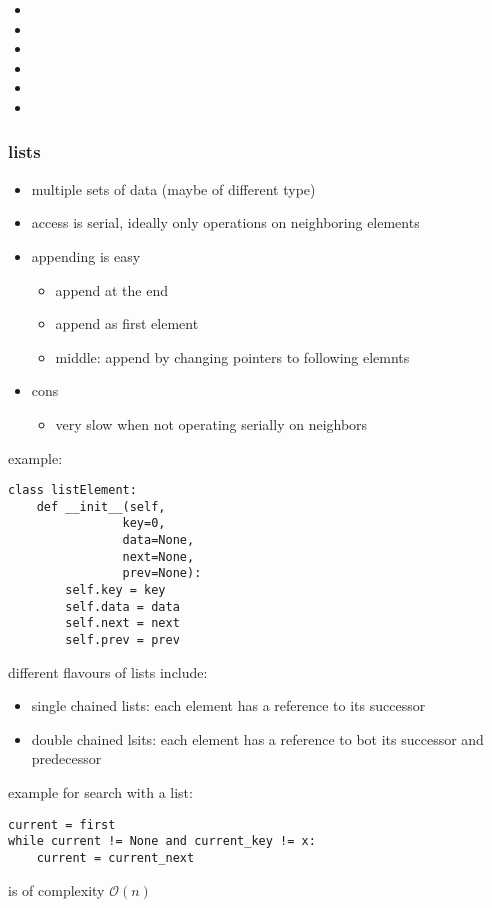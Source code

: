 \documentclass[a4paper]{article}
\begin{document}
\begin{itemize}
    \item {}
    \item {}
    \item {}
    \item {}
    \item {}
    \item {}
\end{itemize}

\subsubsection{lists}
\begin{itemize}
    \item multiple sets of data (maybe of different type)
    \item access is serial, ideally only operations on neighboring elements
    \item appending is easy
        \begin{itemize}
            \item append at the end
            \item append as first element
            \item middle: append by changing pointers to following elemnts
        \end{itemize}
    \item cons
        \begin{itemize}
            \item very slow when not operating serially on neighbors
        \end{itemize}
\end{itemize}
example:
\begin{lstlisting}
class listElement:
    def __init__(self,
                key=0,
                data=None,
                next=None,
                prev=None):
        self.key = key
        self.data = data
        self.next = next
        self.prev = prev
\end{lstlisting}
different flavours of lists include:
\begin{itemize}
    \item single chained lists: each element has a reference to its successor
    \item double chained lsits: each element has a reference to bot its successor and predecessor
\end{itemize}
example for search with a list:
\begin{lstlisting}
current = first
while current != None and current_key != x:
    current = current_next
\end{lstlisting}
is of complexity $ \mathcal{O}(n) $ 
\end{document}
